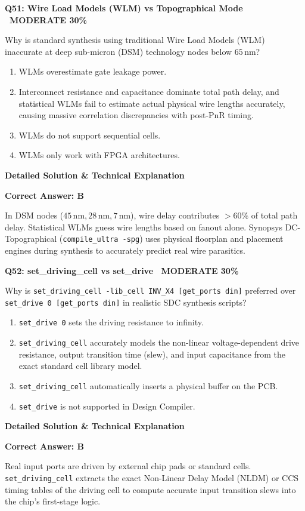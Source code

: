 \documentclass[11pt,a4paper]{article}
\newcommand{\badgemod}{{\color{white}\colorbox{modoran}{\bfseries\sffamily\tiny\ MODERATE 30\%\ }}}
\newenvironment{qbox}[2]{%
  \begin{mdframed}[style=qstyle]%
  {\bfseries\sffamily\color{primaryblue}#1 \hfill #2}\par\vspace{2pt}%
}{%
  \end{mdframed}%
}
\newenvironment{ansbox}{%
  \begin{mdframed}[style=ansstyle]%
  {\bfseries\sffamily\color{ansgreen}\small Detailed Solution \& Technical Explanation}\par\vspace{2pt}\small%
}{%
  \end{mdframed}%
}
\begin{document}
\begin{qbox}{Q51: Wire Load Models (WLM) vs Topographical Mode}{\badgemod}
Why is standard synthesis using traditional Wire Load Models (WLM) inaccurate at deep sub-micron (DSM) technology nodes below $65\,\text{nm}$?
\begin{enumerate}[label=\textbf{\Alph*.}]
  \item WLMs overestimate gate leakage power.
  \item Interconnect resistance and capacitance dominate total path delay, and statistical WLMs fail to estimate actual physical wire lengths accurately, causing massive correlation discrepancies with post-PnR timing.
  \item WLMs do not support sequential cells.
  \item WLMs only work with FPGA architectures.
\end{enumerate}
\end{qbox}
\begin{ansbox}
\textbf{Correct Answer: B}

In DSM nodes ($45\,\text{nm}, 28\,\text{nm}, 7\,\text{nm}$), wire delay contributes $>60\%$ of total path delay. Statistical WLMs guess wire lengths based on fanout alone. Synopsys DC-Topographical (\texttt{compile\_ultra -spg}) uses physical floorplan and placement engines during synthesis to accurately predict real wire parasitics.
\end{ansbox}

\begin{qbox}{Q52: set\_driving\_cell vs set\_drive}{\badgemod}
Why is \texttt{set\_driving\_cell -lib\_cell INV\_X4 [get\_ports din]} preferred over \texttt{set\_drive 0 [get\_ports din]} in realistic SDC synthesis scripts?
\begin{enumerate}[label=\textbf{\Alph*.}]
  \item \texttt{set\_drive 0} sets the driving resistance to infinity.
  \item \texttt{set\_driving\_cell} accurately models the non-linear voltage-dependent drive resistance, output transition time (slew), and input capacitance from the exact standard cell library model.
  \item \texttt{set\_driving\_cell} automatically inserts a physical buffer on the PCB.
  \item \texttt{set\_drive} is not supported in Design Compiler.
\end{enumerate}
\end{qbox}
\begin{ansbox}
\textbf{Correct Answer: B}

Real input ports are driven by external chip pads or standard cells. \texttt{set\_driving\_cell} extracts the exact Non-Linear Delay Model (NLDM) or CCS timing tables of the driving cell to compute accurate input transition slews into the chip's first-stage logic.
\end{ansbox}
\end{document}
